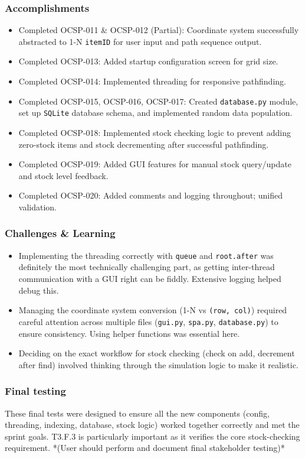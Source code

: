 \subsubsection{Accomplishments}
\begin{itemize}
	\item Completed OCSP-011 \& OCSP-012 (Partial): Coordinate system successfully abstracted to 1-N \verb|itemID| for user input and path sequence output.
	\item Completed OCSP-013: Added startup configuration screen for grid size.
	\item Completed OCSP-014: Implemented threading for responsive pathfinding.
	\item Completed OCSP-015, OCSP-016, OCSP-017: Created \verb|database.py| module, set up \verb|SQLite| database schema, and implemented random data population.
	\item Completed OCSP-018: Implemented stock checking logic to prevent adding zero-stock items and stock decrementing after successful pathfinding.
	\item Completed OCSP-019: Added GUI features for manual stock query/update and stock level feedback.
	\item Completed OCSP-020: Added comments and logging throughout; unified validation.
\end{itemize}

\subsubsection{Challenges \& Learning}
\begin{itemize}
	\item Implementing the threading correctly with \verb|queue| and \verb|root.after| was definitely the most technically challenging part, as getting inter-thread communication with a GUI right can be fiddly. Extensive logging helped debug this.
	\item Managing the coordinate system conversion (1-N vs \verb|(row, col)|) required careful attention across multiple files (\verb|gui.py|, \verb|spa.py|, \verb|database.py|) to ensure consistency. Using helper functions was essential here.
	\item Deciding on the exact workflow for stock checking (check on add, decrement after find) involved thinking through the simulation logic to make it realistic.
\end{itemize}

\subsubsection{Final testing}
These final tests were designed to ensure all the new components (config, threading, indexing, database, stock logic) worked together correctly and met the sprint goals. T3.F.3 is particularly important as it verifies the core stock-checking requirement.
*(User should perform and document final stakeholder testing)*

